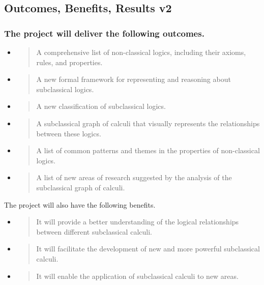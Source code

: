 \hypertarget{outcomes-benefits-results-v2}{%
\subsection{Outcomes, Benefits, Results
v2}\label{outcomes-benefits-results-v2}}

\hypertarget{the-project-will-deliver-the-following-outcomes.}{%
\subsubsection{The project will deliver the following
outcomes.}\label{the-project-will-deliver-the-following-outcomes.}}

\begin{itemize}
\item
  \begin{quote}
  A comprehensive list of non-classical logics, including their axioms,
  rules, and properties.
  \end{quote}
\item
  \begin{quote}
  A new formal framework for representing and reasoning about
  subclassical logics.
  \end{quote}
\item
  \begin{quote}
  A new classification of subclassical logics.
  \end{quote}
\item
  \begin{quote}
  A subclassical graph of calculi that visually represents the
  relationships between these logics.
  \end{quote}
\item
  \begin{quote}
  A list of common patterns and themes in the properties of
  non-classical logics.
  \end{quote}
\item
  \begin{quote}
  A list of new areas of research suggested by the analysis of the
  subclassical graph of calculi.
  \end{quote}
\end{itemize}

The project will also have the following benefits.

\begin{itemize}
\item
  \begin{quote}
  It will provide a better understanding of the logical relationships
  between different subclassical calculi.
  \end{quote}
\item
  \begin{quote}
  It will facilitate the development of new and more powerful
  subclassical calculi.
  \end{quote}
\item
  \begin{quote}
  It will enable the application of subclassical calculi to new areas.
  \end{quote}
\end{itemize}

